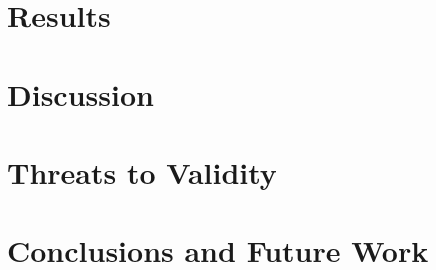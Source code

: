 \documentclass{ceurart}
\begin{document}
\section{Results}

\section{Discussion}

\section{Threats to Validity}

\section{Conclusions and Future Work}


\end{document}
